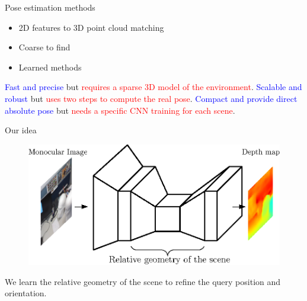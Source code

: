 \begin{frame}{Pose estimation methods}
	\begin{itemize}
		\item 2D features to 3D point cloud matching
		\item<2-> Coarse to find
		\item<3-> Learned methods
	\end{itemize}
		
	\vfill	
	
	{
		\textcolor{blue}{Fast and precise} but \textcolor{red}{requires a sparse 3D model of the environment}.
	}
	\only<2>
	{
		\textcolor{blue}{Scalable and robust} but \textcolor{red}{uses two steps to compute the real pose}.
	}
	\only<3>
	{
		\textcolor{blue}{Compact and provide direct absolute pose} but \textcolor{red}{needs a specific CNN training for each scene}.
	}
		
\end{frame}	

\begin{frame}{Our idea}
		\begin{figure}
			\includegraphics[width=0.5\linewidth]{images/intro/encoder_dec}
		\end{figure}	
		
		\vfill
		
		We learn the relative geometry of the scene to refine the query position and orientation.
\end{frame}

